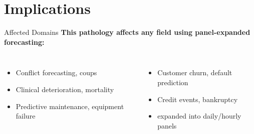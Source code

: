 \documentclass[aspectratio=169]{beamer}
\begin{document}
\section{Implications}

\begin{frame}{Affected Domains}
\textbf{This pathology affects any field using panel-expanded forecasting:}

\vspace{0.5em}
\begin{columns}[T]
\begin{itemize}
\item {} Conflict forecasting, coups
\item {} Clinical deterioration, mortality
\item {} Predictive maintenance, equipment failure
\end{itemize}

\begin{itemize}
\item {} Customer churn, default prediction
\item {} Credit events, bankruptcy
\item {} expanded into daily/hourly panels
\end{itemize}
\end{columns}

\vspace{1em}
\begin{center}
\end{center}
\end{frame}
\end{document}
